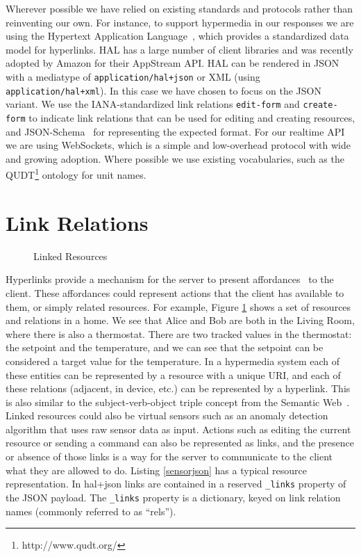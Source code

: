\documentclass{acm_proc_article-sp}
\begin{document}
Wherever possible we have relied on existing standards and protocols rather
than reinventing our own. For instance, to support hypermedia in our responses
we are using the Hypertext Application Language~\cite{json-hal-draft}, which
provides a standardized data model for hyperlinks. HAL has a large number of
client libraries and was recently adopted by Amazon for their AppStream API.
HAL can be rendered in JSON with a mediatype of \texttt{application/hal+json}
or XML (using \mbox{\texttt{application/hal+xml}}). In this case we have chosen to focus on
the JSON variant. We use the IANA-standardized link relations
\texttt{edit-form} and \texttt{create-form} to indicate link relations that can
be used for editing and creating resources, and
JSON-Schema~\cite{json-schema-draft} for representing the expected format. For
our realtime API we are using WebSockets, which is a simple and low-overhead
protocol with wide and growing adoption. Where possible we use existing
vocabularies, such as the QUDT\footnote{http://www.qudt.org/} ontology for unit
names.

\section{Link Relations}

\begin{figure}
    \centering
    
    \caption{Linked Resources}
    \label{hyperlinks}
\end{figure}

Hyperlinks provide a mechanism for the server to present
affordances~\cite{gibson} to the client. These affordances could represent
actions that the client has available to them, or simply related resources. For
example, Figure \ref{hyperlinks} shows a set of resources and relations in a
home. We see that Alice and Bob are both in the Living Room, where there is
also a thermostat. There are two tracked values in the thermostat: the setpoint
and the temperature, and we can see that the setpoint can be considered a
target value for the temperature. In a hypermedia system each of these entities
can be represented by a resource with a unique URI, and each of these
relations (adjacent, in device, etc.) can be represented by a hyperlink. This
is also similar to the subject-verb-object triple concept from the Semantic
Web~\cite{bernerslee2001semantic}. Linked resources could also be virtual
sensors such as an anomaly detection algorithm that uses raw sensor data as
input. Actions such as editing the current resource or sending a command can
also be represented as links, and the presence or absence of those links is a
way for the server to communicate to the client what they are allowed to do.
Listing \ref{sensorjson} has a typical resource representation.  In hal+json
links are contained in a reserved \texttt{\_links} property of the JSON
payload. The \texttt{\_links} property is a dictionary, keyed on link relation
names (commonly referred to as ``rels'').
\end{document}

